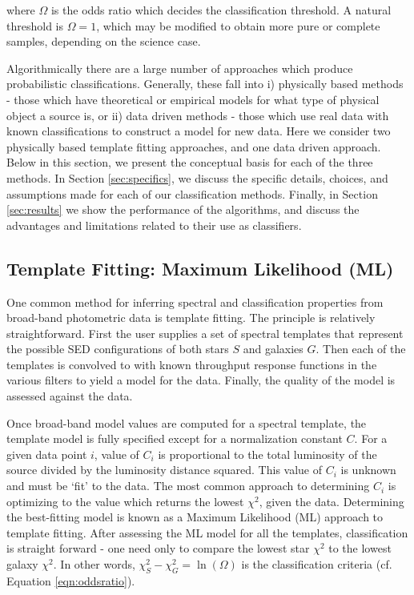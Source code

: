 \documentclass[12pt,preprint]{aastex}
\begin{document}
\noindent where $\Omega$ is the odds ratio which decides the classification 
threshold.  A natural threshold is $\Omega=1$, which may be modified 
to obtain more pure or complete samples, depending on the science case. 

Algorithmically there are a large number of approaches which 
produce probabilistic classifications.  Generally, these fall into i) physically 
based methods - those which have theoretical or empirical models for 
what type of physical object a source is, or ii) data driven methods - those 
which use real data with known classifications to construct a model for new 
data.  Here we consider two physically 
based template fitting approaches, and one data driven approach.  Below 
in this section, we present the conceptual basis for each of the three methods. 
In Section \ref{sec:specifics}, we discuss the specific details, choices, and 
assumptions made for each of our classification methods.  Finally, in Section 
\ref{sec:results} we show the performance of the algorithms, and discuss the 
advantages and limitations related to their use as classifiers.


\subsection{Template Fitting: Maximum Likelihood (ML)}
\label{ssec:MLmethod}

One common method for inferring spectral and classification properties 
from broad-band photometric data is template fitting.  The principle is 
relatively straightforward. First the user supplies a set of spectral templates 
that represent the possible SED configurations of both stars $S$ and 
galaxies $G$.  Then each of the templates is convolved to with known 
throughput response functions in the various filters to yield a model for 
the data.  Finally, the quality of the model is assessed against the data.  

Once broad-band model values are computed for a spectral template, the 
template model is fully specified except for a normalization constant $C$.  
For a given data point $i$, value of $C_i$ is proportional to 
the total luminosity of the source divided by the luminosity distance 
squared.  This value of $C_i$ is unknown and must be `fit' to the data.  The 
most common approach to determining $C_i$ is optimizing to the value 
which returns the lowest $\chi^2$, given the data.  Determining the best-fitting 
model is known as a Maximum Likelihood (ML) approach to template fitting.  
After assessing the ML model for all the templates, classification is straight forward - 
one need only to compare the lowest star $\chi^2$ to the lowest galaxy 
$\chi^2$.  In other words, $\chi^2_S-\chi^2_G=\ln(\Omega)$ is the classification 
criteria (cf. Equation \ref{eqn:oddsratio}).  
\end{document}
